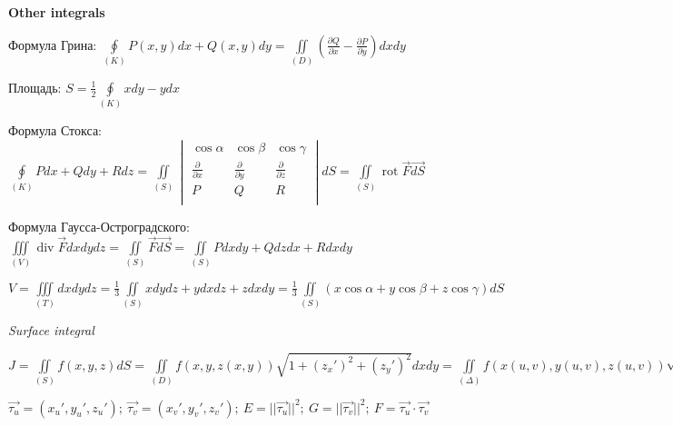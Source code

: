 \begin{center}
    \textbf{Other integrals}
\end{center}

Формула Грина: $\displaystyle\oint\limits_{(K)}P(x, y)dx + Q(x, y)dy = \iint\limits_{(D)}\left(\frac{\partial Q}{\partial x} - \frac{\partial P}{\partial y}\right)dxdy$

Площадь: $S = \frac{1}{2}\oint\limits_{(K)}xdy - ydx$

Формула Стокса: $\displaystyle \oint\limits_{(K)} Pdx + Qdy + Rdz = \iint\limits_{(S)}\begin{vmatrix}
    \cos{\alpha} & \cos{\beta} & \cos{\gamma} \\
    \frac{\partial}{\partial{x}} & \frac{\partial}{\partial{y}} & \frac{\partial}{\partial{z}} \\
    P & Q & R \\
\end{vmatrix}dS =  \iint\limits_{(S)} \operatorname{rot}\vec{F} \vec{dS}$ 

Формула Гаусса-Остроградского: $\displaystyle \iiint\limits_{(V)} \operatorname{div}\vec{F}dxdydz = \iint\limits_{(S)} \vec{F}\vec{dS} = \iint\limits_{(S)}Pdxdy + Qdzdx + Rdxdy$ 

$\displaystyle V = \iiint\limits_{(T)}dxdydz = \frac{1}{3}\iint\limits_{(S)}xdydz+ydxdz+zdxdy = \frac{1}{3}\iint\limits_{(S)}(x\cos{\alpha} + y\cos{\beta} + z\cos{\gamma})dS$

\vspace{2ex}
\textit{Surface integral}

$\displaystyle J = \iint\limits_{(S)}f(x, y, z)dS = \iint\limits_{(D)}f(x, y, z(x, y))\sqrt{1+(z_x')^2+(z_y')^2}dxdy = \iint\limits_{(\Delta)}f(x(u,v),y(u,v),z(u,v))\sqrt{EG - F^2}dudv$

$\displaystyle \vec{\tau_u} = (x_u',y_u',z_u'); ~\vec{\tau_v} = (x_v',y_v',z_v'); ~E = ||\vec{\tau_u}||^2; ~G = ||\vec{\tau_v}||^2; ~F = \vec{\tau_u} \cdot \vec{\tau_v}$
























